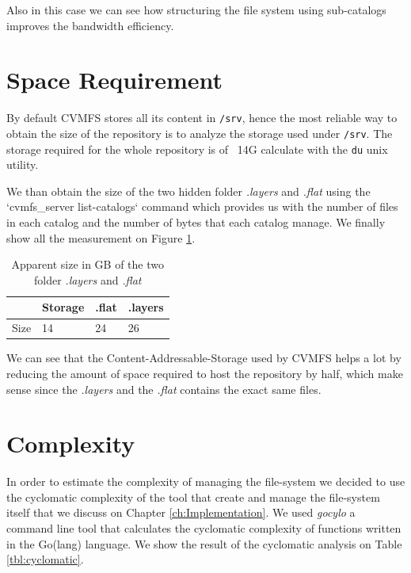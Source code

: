 Also in this case we can see how structuring the file system using sub-catalogs
improves the bandwidth efficiency.

\section{Space Requirement}

By default CVMFS stores all its content in \texttt{/srv}, hence the most
reliable way to obtain the size of the repository is to analyze the storage
used under \texttt{/srv}. The storage required for the whole repository is of
~14G calculate with the \texttt{du} unix utility.

We than obtain the size of the two hidden folder \textit{.layers} and
\textit{.flat} using the `cvmfs\_server list-catalogs` command which provides us
with the number of files in each catalog and the number of bytes that each
catalog manage. We finally show all the measurement on Figure \ref{tab:size-of-repo}.

\begin{table}[]
\begin{center}
\begin{tabular}{|l|lll|}
\hline
        & Storage & .flat & .layers \\ \hline
        Size & 14 & 24    & 26      \\ \hline
\end{tabular}
\end{center}
\caption{Apparent size in GB of the two folder \textit{.layers} and \textit{.flat}}
\label{tab:size-of-repo}
\end{table}

We can see that the Content-Addressable-Storage used by CVMFS helps a lot by
reducing the amount of space required to host the repository by half, which
make sense since the \textit{.layers} and the \textit{.flat} contains the exact
same files.

\section{Complexity}

In order to estimate the complexity of managing the file-system we decided to
use the cyclomatic complexity of the tool that create and manage the
file-system itself that we discuss on Chapter \ref{ch:Implementation}. We used
\textit{gocylo} \cite{gocyclo} a command line tool that calculates the
cyclomatic complexity of functions written in the Go(lang) language. We show
the result of the cyclomatic analysis on Table \ref{tbl:cyclomatic}.

